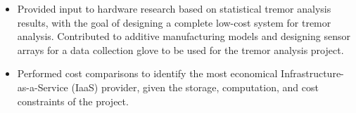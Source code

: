 \documentclass[10pt]{article}
\newcommand{\tabularxwidth}{\textwidth}
\begin{document}
\begin{minipage}{\tabularxwidth}
\begin{itemize}[noitemsep, topsep=3pt, parsep=0pt, partopsep=0pt]
                \item 
    Provided input to hardware research based on statistical tremor analysis results, with the goal of designing a complete low-cost system for tremor analysis. Contributed to additive manufacturing models and designing sensor arrays for a data collection glove to be used for the tremor analysis project.
            
                \item 
    Performed cost comparisons to identify the most economical Infrastructure-as-a-Service (IaaS) provider, given the storage, computation, and cost constraints of the project.
            
        \end{itemize}

        
            \vspace{.5em}
        

    \end{minipage}
    
\end{document}

